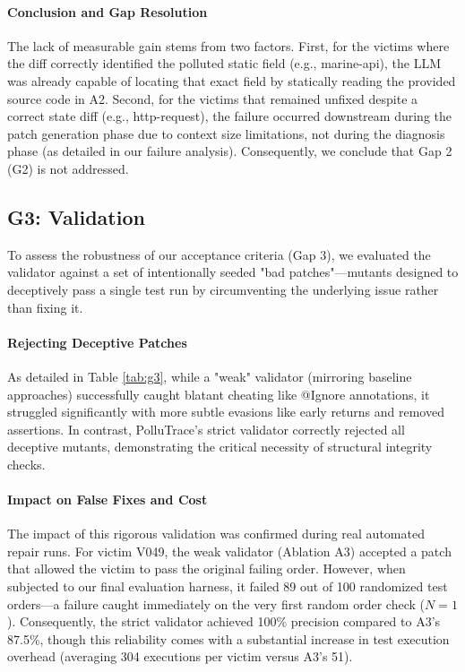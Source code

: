 \documentclass[conference]{IEEEtran}
\begin{document}
\paragraph{Conclusion and Gap Resolution} 
The lack of measurable gain stems from two factors. First, for the victims where the diff correctly identified the polluted static field (e.g., marine-api), the LLM was already capable of locating that exact field by statically reading the provided source code in A2. Second, for the victims that remained unfixed despite a correct state diff (e.g., http-request), the failure occurred downstream during the patch generation phase due to context size limitations, not during the diagnosis phase (as detailed in our failure analysis). Consequently, we conclude that Gap 2 (G2) is not addressed.
\subsection{G3: Validation}

To assess the robustness of our acceptance criteria (Gap 3), we evaluated the validator against a set of intentionally seeded "bad patches"—mutants designed to deceptively pass a single test run by circumventing the underlying issue rather than fixing it.

\paragraph{Rejecting Deceptive Patches}
As detailed in Table \ref{tab:g3}, while a "weak" validator (mirroring baseline approaches) successfully caught blatant cheating like @Ignore annotations, it struggled significantly with more subtle evasions like early returns and removed assertions. In contrast, PolluTrace's strict validator correctly rejected all deceptive mutants, demonstrating the critical necessity of structural integrity checks.

\paragraph{Impact on False Fixes and Cost}
The impact of this rigorous validation was confirmed during real automated repair runs. For victim V049, the weak validator (Ablation A3) accepted a patch that allowed the victim to pass the original failing order. However, when subjected to our final evaluation harness, it failed 89 out of 100 randomized test orders—a failure caught immediately on the very first random order check ($N=1$). Consequently, the strict validator achieved 100\% precision compared to A3's 87.5\%, though this reliability comes with a substantial increase in test execution overhead (averaging 304 executions per victim versus A3's 51).
\end{document}
